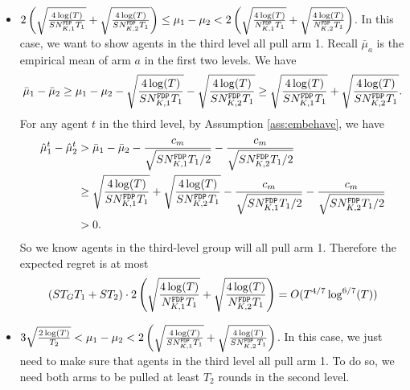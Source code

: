 {\begin{itemize}
Now consider the agents in the third level group. Recall $\bar{\mu}_a$ is the empirical mean of arm $a$ in the history they see. We have
\[
\bar{\mu}_1 - \bar{\mu}_2 \geq \mu_1 -\mu_2 - \sqrt{\frac{4\log(T)}{S\fdpN[1]T_1}} - \sqrt{\frac{4\log(T)}{S\fdpN[2]T_1}} \geq  \sqrt{\frac{4\log(T)}{\fdpN[1]T_1}}
+ \sqrt{\frac{4\log(T)}{\fdpN[2]T_1}}.
\]
Similarly as above, by Assumption \ref{ass:embehave}, we know $\hat{\mu}_1^t - \hat{\mu}_2^t > 0$ for any agent $t$ in the third level. So we know agents in the third-level group will all pull arm 1. Therefore the expected regret is at most $S T_G T_1 = O(T^{4/7} \log^{6/7}(T))$.


\item $2\left(\sqrt{\frac{4\log(T)}{S\fdpN[1]T_1}}
+ \sqrt{\frac{4\log(T)}{S\fdpN[2]T_1}}\right) \leq \mu_1-\mu_2 < 2\left(\sqrt{\frac{4\log(T)}{\fdpN[1]T_1}}
+ \sqrt{\frac{4\log(T)}{\fdpN[2]T_1}}\right)$. In this case, we want to show agents in the third level all pull arm 1. Recall $\bar{\mu}_a$ is the empirical mean of arm $a$ in the first two levels. We have
\[
\bar{\mu}_1 - \bar{\mu}_2 \geq \mu_1 -\mu_2 - \sqrt{\frac{4\log(T)}{S\fdpN[1]T_1}} - \sqrt{\frac{4\log(T)}{S\fdpN[2]T_1}} \geq  \sqrt{\frac{4\log(T)}{S\fdpN[1]T_1}}
+ \sqrt{\frac{4\log(T)}{S\fdpN[2]T_1}}.
\]
For any agent $t$ in the third level, by Assumption \ref{ass:embehave}, we have
\begin{align*}
\hat{\mu}_1^t - \hat{\mu}_2^t &>\bar{\mu}_1 - \bar{\mu}_2 - \frac{c_m}{\sqrt{S\fdpN[1]T_1/2}} - \frac{c_m}{\sqrt{S\fdpN[2]T_1/2}}\\
&\geq  \sqrt{\frac{4\log(T)}{S\fdpN[1]T_1}} + \sqrt{\frac{4\log(T)}{S\fdpN[2]T_1}}- \frac{c_m}{\sqrt{S\fdpN[1]T_1/2}} - \frac{c_m}{\sqrt{S\fdpN[2]T_1/2}}\\
 &> 0.
\end{align*}
So we know agents in the third-level group will all pull arm 1. Therefore the expected regret is at most
\[
(S T_G T_1 + S T_2) \cdot 2\left(\sqrt{\frac{4\log(T)}{\fdpN[1]T_1}}
+ \sqrt{\frac{4\log(T)}{\fdpN[2]T_1}}\right) = O(T^{4/7} \log^{6/7}(T))
\]

\item $ 3\sqrt{\frac{2\log(T)}{T_2}} < \mu_1-\mu_2 < 2\left(\sqrt{\frac{4\log(T)}{S\fdpN[1]T_1}}
+ \sqrt{\frac{4\log(T)}{S\fdpN[2]T_1}}\right)$. In this case, we just need to make sure that agents in the third level all pull arm 1. To do so, we need both arms to be pulled at least $T_2$ rounds in the second level.


\end{itemize}}
